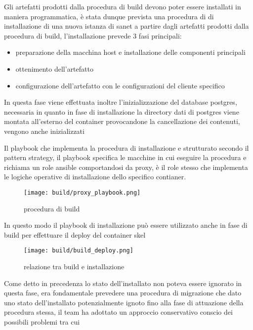 Gli artefatti prodotti dalla procedura di build devono poter essere installati in maniera programmatica, è stata dunque prevista una procedura di di installazione di una nuova istanza di sanet a partire dagli artefatti prodotti dalla procedura di build, l'installazione prevede 3 fasi principali:

\begin{itemize}
  \item{preparazione della macchina host e installazione delle componenti principali}
  \item{ottenimento dell'artefatto}
  \item{configurazione dell'artefatto con le configurazioni del cliente specifico}
\end{itemize}

In questa fase viene effettuata inoltre l'inizializzazione del database postgres, necessaria in quanto in fase di installazione la directory dati di postgres viene montata all'esterno del container provocandone la cancellazione dei contenuti, vengono anche inizializzati

Il playbook che implementa la procedura di installazione e strutturato secondo il pattern strategy, il playbook specifica le macchine in cui eseguire la procedura e richiama un role ansible comportandosi da proxy, è il role stesso che implementa le logiche operative di installazione dello specifico contianer.

\begin{figure}[H]
    \centering
    \texttt{[image: build/proxy\_playbook.png]}
    \caption{procedura di build}
    \label{fig:enter-label}
\end{figure}

In questo modo il playbook di installazione può essere utilizzato anche in fase di build per effettuare il deploy del container skel

\begin{figure}[H]
    \centering
    \texttt{[image: build/build\_deploy.png]}
    \caption{relazione tra build e installazione}
    \label{fig:enter-label}
\end{figure}

Come detto in precedenza lo stato dell'installato non poteva essere ignorato in questa fase, era fondamentale prevedere una procedura di migrazione che dato uno stato dell'installato potenzialmente ignoto fino alla fase di attuazione della procedura stessa, il team ha adottato un approccio conservativo conscio dei possibili problemi tra cui

